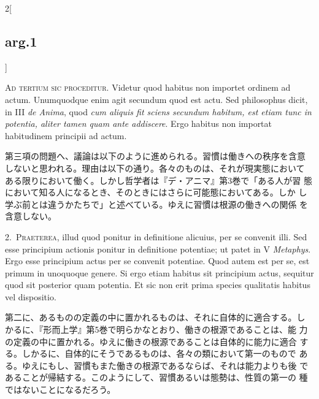 \documentclass[paper=a4paper,fontsize=10pt,jafontsize=9pt,titlepage]{jlreq}
\begin{document}
\begin{paracol}{2}[\subsection{arg.1}]

{\scshape Ad tertium sic proceditur}. Videtur quod habitus non importet ordinem
ad actum. Unumquodque enim agit secundum quod est actu. Sed
philosophus dicit, in III {\itshape de Anima}, quod {\itshape cum aliquis fit sciens
secundum habitum, est etiam tunc in potentia, aliter tamen quam ante
addiscere}. Ergo habitus non importat habitudinem principii ad actum.

\switchcolumn

第三項の問題へ、議論は以下のように進められる。習慣は働きへの秩序を含意
しないと思われる。理由は以下の通り。各々のものは、それが現実態において
ある限りにおいて働く。しかし哲学者は『デ・アニマ』第3巻で「ある人が習
態において知る人になるとき、そのときにはさらに可能態においてある。しか
し学ぶ前とは違うかたちで」と述べている。ゆえに習慣は根源の働きへの関係
を含意しない。


2.~{\scshape Praeterea}, illud quod ponitur in definitione alicuius, per se convenit
illi. Sed esse principium actionis ponitur in definitione potentiae;
ut patet in V {\itshape Metaphys}. Ergo esse principium actus per se convenit
potentiae. Quod autem est per se, est primum in unoquoque genere. Si
ergo etiam habitus sit principium actus, sequitur quod sit posterior
quam potentia. Et sic non erit prima species qualitatis habitus vel
dispositio.

\switchcolumn

第二に、あるものの定義の中に置かれるものは、それに自体的に適合する。し
かるに、『形而上学』第5巻で明らかなとおり、働きの根源であることは、能
力の定義の中に置かれる。ゆえに働きの根源であることは自体的に能力に適合
する。しかるに、自体的にそうであるものは、各々の類において第一のもので
ある。ゆえにもし、習慣もまた働きの根源であるならば、それは能力よりも後
であることが帰結する。このようにして、習慣あるいは態勢は、性質の第一の
種ではないことになるだろう。



\end{paracol}
\end{document}
